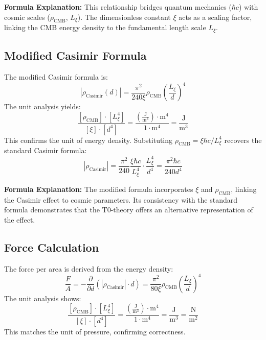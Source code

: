 \documentclass[12pt,a4paper]{article}
\theoremstyle{definition}
\theoremstyle{remark}
\begin{document}
	\textbf{Formula Explanation:} This relationship bridges quantum mechanics ($\hbar c$) with cosmic scales ($\rho_{\text{CMB}}$, $L_\xi$). The dimensionless constant $\xi$ acts as a scaling factor, linking the CMB energy density to the fundamental length scale $L_\xi$.
	
	\subsection{Modified Casimir Formula}
	The modified Casimir formula is:
	\begin{equation}
		|\rho_{\text{Casimir}}(d)| = \frac{\pi^2}{240 \xi} \rho_{\text{CMB}} \left( \frac{L_\xi}{d} \right)^4
	\end{equation}
	The unit analysis yields:
	\begin{equation}
		\frac{[\rho_{\text{CMB}}] \cdot [L_\xi^4]}{[\xi] \cdot [d^4]} = \frac{\left( \frac{\text{J}}{\text{m}^3} \right) \cdot \text{m}^4}{1 \cdot \text{m}^4} = \frac{\text{J}}{\text{m}^3}
	\end{equation}
	This confirms the unit of energy density. Substituting $\rho_{\text{CMB}} = \xi \hbar c / L_\xi^4$ recovers the standard Casimir formula:
	\begin{equation}
		|\rho_{\text{Casimir}}| = \frac{\pi^2}{240} \frac{\xi \hbar c}{L_\xi^4} \cdot \frac{L_\xi^4}{d^4} = \frac{\pi^2 \hbar c}{240 d^4}
	\end{equation}
	
	\textbf{Formula Explanation:} The modified formula incorporates $\xi$ and $\rho_{\text{CMB}}$, linking the Casimir effect to cosmic parameters. Its consistency with the standard formula demonstrates that the T0-theory offers an alternative representation of the effect.
	
	\subsection{Force Calculation}
	The force per area is derived from the energy density:
	\begin{equation}
		\frac{F}{A} = -\frac{\partial}{\partial d} \left( |\rho_{\text{Casimir}}| \cdot d \right) = \frac{\pi^2}{80 \xi} \rho_{\text{CMB}} \left( \frac{L_\xi}{d} \right)^4
	\end{equation}
	The unit analysis shows:
	\begin{equation}
		\frac{[\rho_{\text{CMB}}] \cdot [L_\xi^4]}{[\xi] \cdot [d^4]} = \frac{\left( \frac{\text{J}}{\text{m}^3} \right) \cdot \text{m}^4}{1 \cdot \text{m}^4} = \frac{\text{J}}{\text{m}^3} = \frac{\text{N}}{\text{m}^2}
	\end{equation}
	This matches the unit of pressure, confirming correctness.
	
\end{document}
